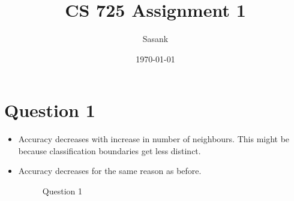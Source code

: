 \documentclass[a4paper]{article}
\begin{document}
\title{CS 725 Assignment 1}
\author{Sasank}
\date{\today}
\maketitle

\section{Question 1}
\begin{itemize}
\item Accuracy decreases with increase in number of neighbours. This might be because classification boundaries get less distinct.	
\item Accuracy decreases for the same reason as before. 
\begin{figure}[h]
    \centering
    \qquad
    \label{fig:example}%
	\caption{Question 1}
\end{figure}

\end{itemize}
\end{document}
